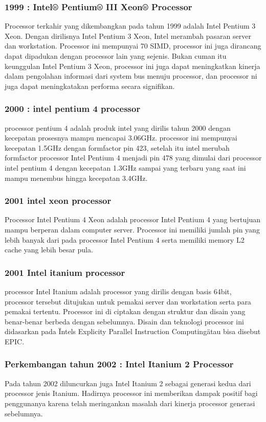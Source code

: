  			\subsubsection{1999 : Intel® Pentium® III Xeon® Processor}
 	Processor terkahir yang dikembangkan pada tahun 1999 adalah Intel Pentium 3 Xeon. Dengan dirilisnya Intel Pentium 3 Xeon, Intel merambah pasaran server dan workstation. Processor ini mempunyai 70 SIMD, processor ini juga dirancang dapat dipadukan dengan processor lain yang sejenis. Bukan cuman itu keunggulan Intel Pentium 3 Xeon, processor ini juga dapat meningkatkan kinerja dalam pengolahan informasi dari system bus menuju processor, dan processor ni juga dapat meningkatakan performa secara signifikan.


			\subsubsection{2000 : intel pentium 4 processor}
 	processor pentium 4 adalah produk intel yang dirilis tahun 2000 dengan kecepatan prosesnya mampu mencapai 3.06GHz. processor ini mempunyai kecepatan 1.5GHz dengan formfactor pin 423, setelah itu intel merubah formfactor processor Intel Pentium 4 menjadi pin 478 yang dimulai dari processor intel pentium 4 dengan kecepatan 1.3GHz sampai yang terbaru yang saat ini mampu menembus hingga kecepatan 3.4GHz.


			\subsubsection{2001 intel xeon processor}
 	Processor Intel Pentium 4 Xeon adalah processor Intel Pentium 4 yang bertujuan mampu berperan dalam computer server. Processor ini memiliki jumlah pin yang lebih banyak dari pada processor Intel Pentium 4 serta memiliki memory L2 cache yang lebih besar pula.
 			\subsubsection{2001 Intel itanium processor}
 	processor Intel Itanium adalah processor yang dirilis dengan basis 64bit, processor tersebut ditujukan untuk pemakai server dan workstation serta para pemakai tertentu. Processor ini di ciptakan dengan struktur dan disain yang benar-benar berbeda dengan sebelumnya. Disain dan teknologi processor ini didasarkan pada \"Intels Explicity Parallel Instruction Computing\" atau bisa disebut EPIC.


 			\subsubsection{Perkembangan tahun 2002 : Intel Itanium 2 Processor }
 	Pada tahun 2002 diluncurkan juga Intel Itanium 2 sebagai generasi kedua dari processor jenis Itanium. Hadirnya processor ini memberikan dampak positif bagi penggunanya karena telah meringankan masalah dari kinerja processor generasi sebelumnya.
